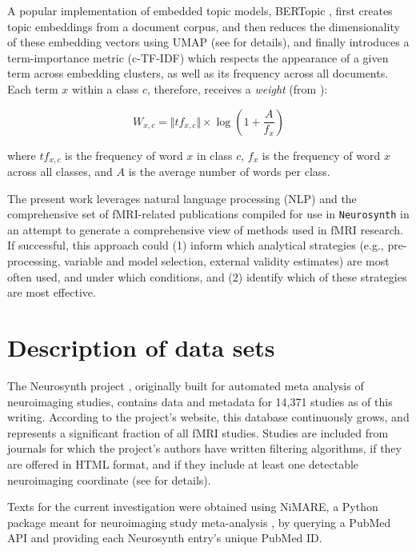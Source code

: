 A popular implementation of embedded topic models, BERTopic \cite{Grootendorst2022a}, first creates topic embeddings from a document corpus, and then reduces the dimensionality of these embedding vectors using UMAP (see \cite{McInnesEtAl2020} for details), and finally introduces a term-importance metric (c-TF-IDF) which respects the appearance of a given term across embedding clusters, as well as its frequency across all documents. Each term $x$ within a class $c$, therefore, receives a \emph{weight} (from \cite{Grootendorst2022a}):

\begin{equation}
	W_{x,c}
	=
	\Vert
	tf_{x, c}
	\Vert
	\times
	\log(1+\frac{A}{f_x})
\end{equation}

where $tf_{x,c}$ is the frequency of word $x$ in class $c$, $f_x$ is the frequency of word $x$ across all classes, and $A$ is the average number of words per class.

The present work leverages natural language processing (NLP) and the comprehensive set of fMRI-related publications compiled for use in \texttt{Neurosynth} \cite{YarkoniEtAl2011} in an attempt to generate a comprehensive view of methods used in fMRI research. If successful, this approach could (1) inform which analytical strategies (e.g., pre-processing, variable and model selection, external validity estimates) are most often used, and under which conditions, and (2) identify which of these strategies are most effective. 


\section{Description of data sets}
\label{sec:papertag.data}


The Neurosynth project \cite{YarkoniEtAl2011}, originally built for automated meta analysis of neuroimaging studies, contains data and metadata for 14,371 studies as of this writing. According to the project's website, this database continuously grows, and represents a significant fraction of all fMRI studies. Studies are included from journals for which the project's authors have written filtering algorithms, if they are offered in HTML format, and if they include at least one detectable neuroimaging coordinate (see \cite{YarkoniEtAl2011} for details). 

Texts for the current investigation were obtained using NiMARE, a Python package meant for neuroimaging study meta-analysis \cite{SaloEtAl2022, SaloEtAl2023}, by querying a PubMed API and providing each Neurosynth entry's unique PubMed ID. 

